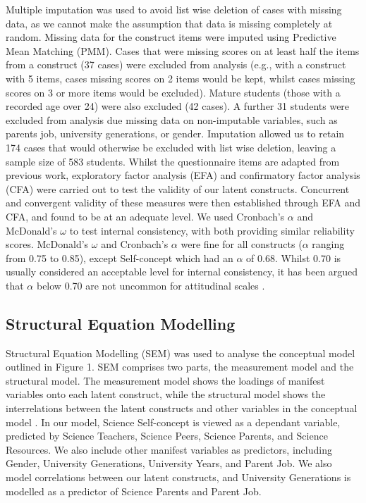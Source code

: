 Multiple imputation was used to avoid list wise deletion of cases with missing data, as we cannot make the assumption that data is missing completely at random. Missing data for the construct items were imputed using Predictive Mean Matching (PMM). Cases that were missing scores on at least half the items from a construct (37 cases) were excluded from analysis (e.g., with a construct with 5 items, cases missing scores on 2 items would be kept, whilst cases missing scores on 3 or more items would be excluded). Mature students (those with a recorded age over 24) were also excluded (42 cases). A further 31 students were excluded from analysis due missing data on non-imputable variables, such as parents job, university generations, or gender. Imputation allowed us to retain 174 cases that would otherwise be excluded with list wise deletion, leaving a  sample size of 583 students. Whilst the questionnaire items are adapted from previous work, exploratory factor analysis (EFA) and confirmatory factor analysis (CFA) were carried out to test the validity of our latent constructs. Concurrent and convergent validity \cite{campbell1959convergent} of these measures were then established through EFA and CFA, and found to be at an adequate level. We used Cronbach's $\alpha$ and McDonald's $\omega$ to test internal consistency, with both providing similar reliability scores. McDonald's $\omega$ and Cronbach's $\alpha$ were fine for all constructs ($\alpha$ ranging from 0.75 to 0.85), except Self-concept which had an $\alpha$ of 0.68. Whilst 0.70 is usually considered an acceptable level for internal consistency, it has been argued that $\alpha$ below 0.70 are not uncommon for attitudinal scales \cite{field2012discovering}. 

\subsection*{Structural Equation Modelling}
Structural Equation Modelling (SEM) was used to analyse the conceptual model outlined in Figure 1. SEM comprises two parts, the measurement model and the structural model. The measurement model shows the loadings of manifest variables onto each latent construct, while the structural model shows the interrelations between the latent constructs and other variables in the conceptual model \cite{schreiber2006reporting}. In our model, Science Self-concept is viewed as a dependant variable, predicted by Science Teachers, Science Peers, Science Parents, and Science Resources. We also include other manifest variables as predictors, including Gender, University Generations, University Years, and Parent Job. We also model correlations between our latent constructs, and University Generations is modelled as a predictor of Science Parents and Parent Job.

